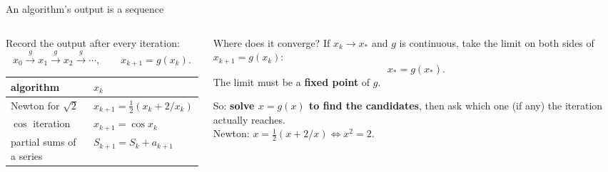 \documentclass[aspectratio=169]{beamer}
\begin{document}
\begin{frame}{An algorithm's output is a sequence}
\begin{columns}[T]
\begin{column}{0.5\textwidth}
\small
Record the output after every iteration:
\[
x_0 \xrightarrow{\ g\ } x_1 \xrightarrow{\ g\ } x_2 \xrightarrow{\ g\ } \cdots, \qquad x_{k+1} = g(x_k).
\]
\renewcommand{\arraystretch}{1.2}
\footnotesize
\begin{tabular}{ll}
\toprule
algorithm & $x_k$ \\
\midrule
Newton for $\sqrt2$ & $x_{k+1} = \tfrac12(x_k + 2/x_k)$ \\
$\cos$ iteration & $x_{k+1} = \cos x_k$ \\
partial sums of a series & $S_{k+1} = S_k + a_{k+1}$ \\
\bottomrule
\end{tabular}
\end{column}
\begin{column}{0.47\textwidth}
\begin{block}{Where does it converge?}
\small If $x_k \to x_\ast$ and $g$ is continuous, take the limit on both sides of $x_{k+1} = g(x_k)$:
\[ x_\ast = g(x_\ast). \]
The limit must be a \textbf{fixed point} of $g$.
\end{block}
\footnotesize So: \textbf{solve $x = g(x)$ to find the candidates}, then ask which one (if any) the iteration actually reaches.\\[4pt]
Newton: $x = \tfrac12(x + 2/x) \iff x^2 = 2$.
\end{column}
\end{columns}
\end{frame}
\end{document}
